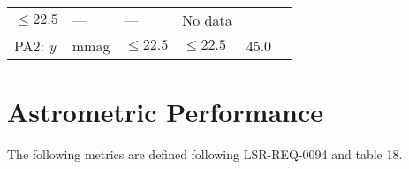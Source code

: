 \documentclass[DM,lsstdraft,toc]{lsstdoc}
\begin{document}
\begin{longtable}[]{@{}llllll@{}}
\begin{minipage}[t]{0.17\columnwidth}
\(\leq 22.5\)\strut
\end{minipage} & \begin{minipage}[t]{0.17\columnwidth}\raggedright\strut
---\strut
\end{minipage} & \begin{minipage}[t]{0.12\columnwidth}\raggedright\strut
---\strut
\end{minipage} & \begin{minipage}[t]{0.17\columnwidth}\raggedright\strut
No data\strut
\end{minipage}\tabularnewline
\begin{minipage}[t]{0.14\columnwidth}\raggedright\strut
PA2: \emph{y}\strut
\end{minipage} & \begin{minipage}[t]{0.06\columnwidth}\raggedright\strut
mmag\strut
\end{minipage} & \begin{minipage}[t]{0.17\columnwidth}\raggedright\strut
\(\leq 22.5\)\strut
\end{minipage} & \begin{minipage}[t]{0.17\columnwidth}\raggedright\strut
\(\leq 22.5\)\strut
\end{minipage} & \begin{minipage}[t]{0.12\columnwidth}\raggedright\strut
45.0\strut
\end{minipage} & \begin{minipage}[t]{0.17\columnwidth}\raggedright\strut
\strut
\end{minipage}\tabularnewline
\bottomrule
\end{longtable}

\section{Astrometric Performance}\label{astrometric-performance}


The following metrics are defined following LSR-REQ-0094
 and  table 18.
\end{document}

